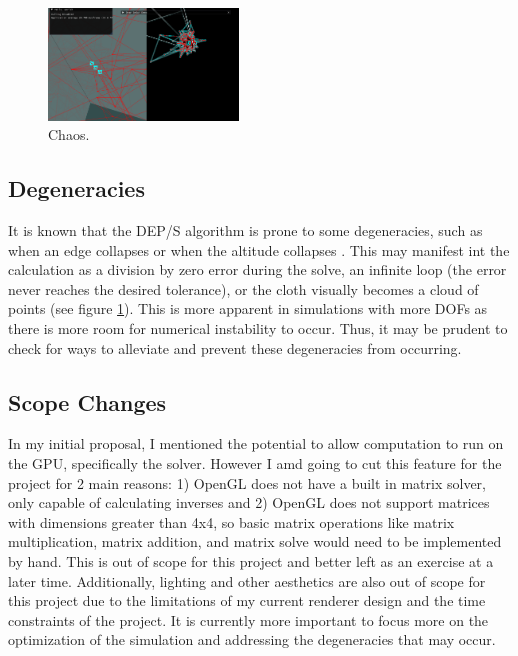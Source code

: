 \documentclass[letterpaper, 10 pt, conference]{ieeeconf}  %
\begin{document}
        \begin{figure}[!ht]
                \centering
                \includegraphics[width=0.45\textwidth,keepaspectratio]{chaos1.PNG}
                \caption{Chaos.}
                \label{"fig:chaos"}
        \end{figure}

        \subsection{Degeneracies}
        It is known that the DEP/S algorithm is prone to some degeneracies, such as when an edge collapses or when the altitude collapses \cite{Tamstorf2013discrete}. This may manifest int the calculation as a division by zero error during the solve, an infinite loop (the error never reaches the desired tolerance), or the cloth visually becomes a cloud of points (see figure \ref{"fig:chaos"}). This is more apparent in simulations with more DOFs as there is more room for numerical instability to occur. Thus, it may be prudent to check for ways to alleviate and prevent these degeneracies from occurring.

        \subsection{Scope Changes}
        In my initial proposal, I mentioned the potential to allow computation to run on the GPU, specifically the solver\cite{bolz2003sparse}. However I amd going to cut this feature for the project for 2 main reasons: 1) OpenGL does not have a built in matrix solver, only capable of calculating inverses and 2) OpenGL does not support matrices with dimensions greater than 4x4, so basic matrix operations like matrix multiplication, matrix addition, and matrix solve would need to be implemented by hand. This is out of scope for this project and better left as an exercise at a later time. Additionally, lighting and other aesthetics are also out of scope for this project due to the limitations of my current renderer design and the time constraints of the project. It is currently more important to focus more on the optimization of the simulation and addressing the degeneracies that may occur.
\end{document}
